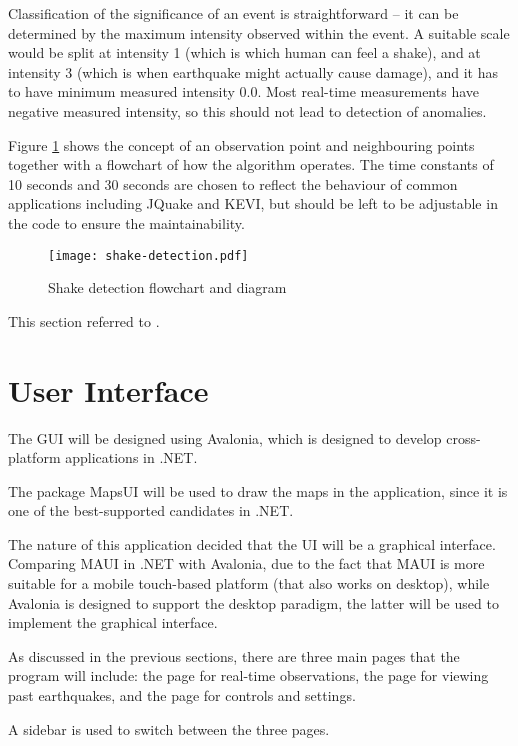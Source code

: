 Classification of the significance of an event is straightforward -- it can be determined by the maximum intensity observed within the event. A suitable scale would be split at intensity 1 (which is which human can feel a shake), and at intensity 3 (which is when earthquake might actually cause damage), and it has to have minimum measured intensity 0.0. Most real-time measurements have negative measured intensity, so this should not lead to detection of anomalies.

Figure \ref{fig:shake-detection-diag} shows the concept of an observation point and neighbouring points together with a flowchart of how the algorithm operates. The time constants of 10 seconds and 30 seconds are chosen to reflect the behaviour of common applications including JQuake and KEVI, but should be left to be adjustable in the code to ensure the maintainability.

\begin{figure}[htp]
    \centering
    \texttt{[image: shake-detection.pdf]}
    \caption{Shake detection flowchart and diagram}
    \label{fig:shake-detection-diag}
\end{figure}

This section referred to \autocite{blog-ingen-shake-detection}.

\section{User Interface}

The GUI will be designed using Avalonia, which is designed to develop cross-platform applications in .NET.

The package MapsUI \autocite{mapsui-github} will be used to draw the maps in the application, since it is one of the best-supported candidates in .NET.

The nature of this application decided that the UI will be a graphical interface. Comparing MAUI in .NET with Avalonia, due to the fact that MAUI is more suitable for a mobile touch-based platform (that also works on desktop), while Avalonia is designed to support the desktop paradigm, the latter will be used to implement the graphical interface.

As discussed in the previous sections, there are three main pages that the program will include: the page for real-time observations, the page for viewing past earthquakes, and the page for controls and settings.

A sidebar is used to switch between the three pages.

